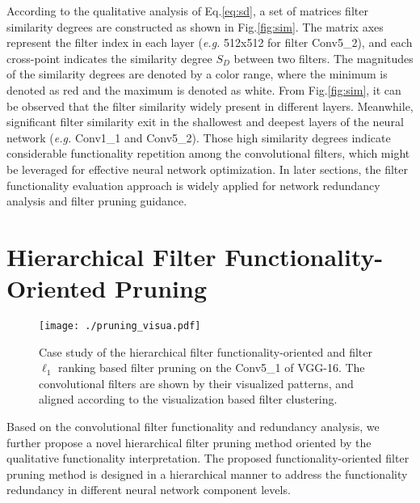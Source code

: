 \documentclass{article} %
\begin{document}
According to the qualitative analysis of Eq.\ref{eq:sd}, a set of matrices filter similarity degrees are constructed as shown in Fig.\ref{fig:sim}.
	The matrix axes represent the filter index in each layer (\textit{e.g.} 512x512 for filter Conv5\_2), and each cross-point indicates the similarity degree $S_{D}$ between two filters.
	The magnitudes of the similarity degrees are denoted by a color range, where the minimum is denoted as red and the maximum is denoted as white.
	From Fig.\ref{fig:sim}, it can be observed that the filter similarity widely present in different layers.
	Meanwhile, significant filter similarity exit in the shallowest and deepest layers of the neural network (\textit{e.g.} Conv1\_1 and Conv5\_2).
	Those high similarity degrees indicate considerable functionality repetition among the convolutional filters, which might be leveraged for effective neural network optimization.
In later sections, the filter functionality evaluation approach is widely applied for network redundancy analysis and filter pruning guidance.
\section{Hierarchical Filter Functionality-Oriented Pruning}\label{sec:pruning}\begin{figure}[t]
	\centering
	\texttt{[image: ./pruning\_visua.pdf]}
	\caption*{\hspace{1mm}(a) Proposed functionality-oriented filter pruning. \hspace{10mm} (b) $\ell_1$ ranking based filter pruning.}
	\caption{Case study of the hierarchical filter functionality-oriented  and filter $\ell_1$ ranking based filter pruning on the Conv5\_1 of VGG-16.
		The convolutional filters are shown by their visualized patterns, and aligned according to the visualization based filter clustering.}
	\label{fig:pruning}
\end{figure}

Based on the convolutional filter functionality and redundancy analysis, we further propose a novel hierarchical filter pruning method oriented by the qualitative functionality interpretation.
The proposed functionality-oriented filter pruning method is designed in a hierarchical manner to address the functionality redundancy in different neural network component levels.
\end{document}
